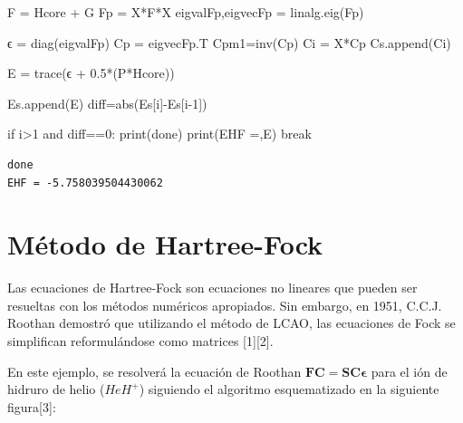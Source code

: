 \documentclass[
  letterpaper,
  DIV=11,
  numbers=noendperiod]{scrreprt}
\newenvironment{Shaded}{\begin{snugshade}}{\end{snugshade}}
\newcommand{\BuiltInTok}[1]{\textcolor[rgb]{0.00,0.23,0.31}{#1}}
\newcommand{\ControlFlowTok}[1]{\textcolor[rgb]{0.00,0.23,0.31}{#1}}
\newcommand{\DecValTok}[1]{\textcolor[rgb]{0.68,0.00,0.00}{#1}}
\newcommand{\FloatTok}[1]{\textcolor[rgb]{0.68,0.00,0.00}{#1}}
\newcommand{\KeywordTok}[1]{\textcolor[rgb]{0.00,0.23,0.31}{#1}}
\newcommand{\NormalTok}[1]{\textcolor[rgb]{0.00,0.23,0.31}{#1}}
\newcommand{\OperatorTok}[1]{\textcolor[rgb]{0.37,0.37,0.37}{#1}}
\newcommand{\StringTok}[1]{\textcolor[rgb]{0.13,0.47,0.30}{#1}}
\begin{document}
\begin{Shaded}
\begin{Highlighting}[]
\NormalTok{    F }\OperatorTok{=}\NormalTok{ Hcore }\OperatorTok{+}\NormalTok{ G}
\NormalTok{    Fp }\OperatorTok{=}\NormalTok{ X}\OperatorTok{*}\NormalTok{F}\OperatorTok{*}\NormalTok{X}
\NormalTok{    eigvalFp,eigvecFp }\OperatorTok{=}\NormalTok{ linalg.eig(Fp)}
    
\NormalTok{    ϵ }\OperatorTok{=}\NormalTok{ diag(eigvalFp)}
\NormalTok{    Cp }\OperatorTok{=}\NormalTok{ eigvecFp.T}
\NormalTok{    Cpm1}\OperatorTok{=}\NormalTok{inv(Cp)}
\NormalTok{    Ci }\OperatorTok{=}\NormalTok{ X}\OperatorTok{*}\NormalTok{Cp}
\NormalTok{    Cs.append(Ci)}

\NormalTok{    E }\OperatorTok{=}\NormalTok{ trace(ϵ }\OperatorTok{+} \FloatTok{0.5}\OperatorTok{*}\NormalTok{(P}\OperatorTok{*}\NormalTok{Hcore))}

\NormalTok{    Es.append(E)}
\NormalTok{    diff}\OperatorTok{=}\BuiltInTok{abs}\NormalTok{(Es[i]}\OperatorTok{{-}}\NormalTok{Es[i}\OperatorTok{{-}}\DecValTok{1}\NormalTok{])}
    
    \ControlFlowTok{if}\NormalTok{ i}\OperatorTok{\textgreater{}}\DecValTok{1} \KeywordTok{and}\NormalTok{ diff}\OperatorTok{==}\DecValTok{0}\NormalTok{:}
        \BuiltInTok{print}\NormalTok{(}\StringTok{\textquotesingle{}done\textquotesingle{}}\NormalTok{)}
        \BuiltInTok{print}\NormalTok{(}\StringTok{\textquotesingle{}EHF =\textquotesingle{}}\NormalTok{,E)}
        \ControlFlowTok{break}
\end{Highlighting}
\end{Shaded}

\begin{verbatim}
done
EHF = -5.758039504430062
\end{verbatim}

\hypertarget{muxe9todo-de-hartree-fock-1}{%
\chapter{Método de Hartree-Fock}\label{muxe9todo-de-hartree-fock-1}}

Las ecuaciones de Hartree-Fock son ecuaciones no lineares que pueden ser
resueltas con los métodos numéricos apropiados. Sin embargo, en 1951,
C.C.J. Roothan demostró que utilizando el método de LCAO, las ecuaciones
de Fock se simplifican reformulándose como matrices {[}1{]}{[}2{]}.

En este ejemplo, se resolverá la ecuación de Roothan
\(\textbf{F}\textbf{C}=\textbf{S}\textbf{C}\pmb{\epsilon}\) para el ión
de hidruro de helio (\(HeH^{+}\)) siguiendo el algoritmo esquematizado
en la siguiente figura{[}3{]}:
\end{document}
